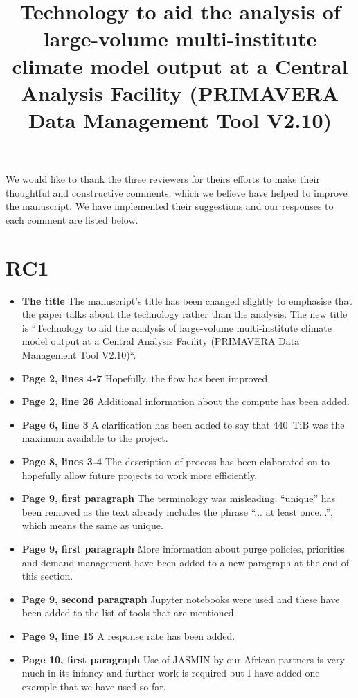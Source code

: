 \documentclass[12pt,a4paper]{article}
\begin{document}
\title{Technology to aid the analysis of large-volume multi-institute climate model output at a Central Analysis Facility (PRIMAVERA Data Management Tool V2.10)}
\maketitle
We would like to thank the three reviewers for theirs efforts to make their thoughtful and constructive comments, which we believe have helped to improve the manuscript. We have implemented their suggestions and our responses to each comment are listed below.

\section{RC1}
\begin{itemize}
\item \textbf{The title} The manuscript's title has been changed slightly to emphasise that the paper talks about the technology rather than the analysis. The new title is ``Technology to aid the analysis of large-volume multi-institute climate model output at a Central Analysis Facility (PRIMAVERA Data Management Tool V2.10)``.

\item \textbf{Page 2, lines 4-7} Hopefully, the flow has been improved.

\item \textbf{Page 2, line 26} Additional information about the compute has been added.

\item \textbf{Page 6, line 3} A clarification has been added to say that 440~TiB was the maximum available to the project.

\item \textbf{Page 8, lines 3-4} The description of process has been elaborated on to hopefully allow future projects to work more efficiently. 

\item \textbf{Page 9, first paragraph} The terminology was misleading. ``unique'' has been removed as the text already includes the phrase ``... at least once...'', which means the same as unique. 

\item \textbf{Page 9, first paragraph} More information about purge policies, priorities and demand management have been added to a new paragraph at the end of this section.

\item \textbf{Page 9, second paragraph} Jupyter notebooks were used and these have been added to the list of tools that are mentioned.

\item \textbf{Page 9, line 15} A response rate has been added.

\item \textbf{Page 10, first paragraph}  Use of JASMIN by our African partners is very much in its infancy and further work is required but I have added one example that we have used so far.
\end{itemize}
\end{document}
